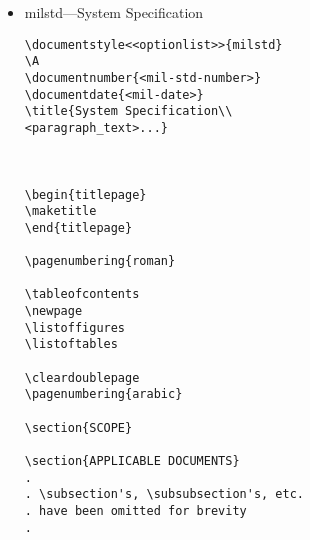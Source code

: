 \begin{itemize}
\begin{small}
\begin{verbatim}
\appendix
%
% \section will now generate appendices starting with section 10, 20, etc.
%
\section{<text>} % Section 10, Appendix I

\section{<text>} % Section 20, Appendix II


\end{verbatim}
\end{small}

\item milstd---System Specification

\begin{small}
\begin{verbatim}
\documentstyle<<optionlist>>{milstd}
\A
\documentnumber{<mil-std-number>}
\documentdate{<mil-date>}
\title{System Specification\\
<paragraph_text>...}



\begin{titlepage}
\maketitle
\end{titlepage}

\pagenumbering{roman}

\tableofcontents
\newpage
\listoffigures
\listoftables

\cleardoublepage
\pagenumbering{arabic}

\section{SCOPE}

\section{APPLICABLE DOCUMENTS}
.
. \subsection's, \subsubsection's, etc.
. have been omitted for brevity
.


\end{verbatim}
\end{small}
\end{itemize}
